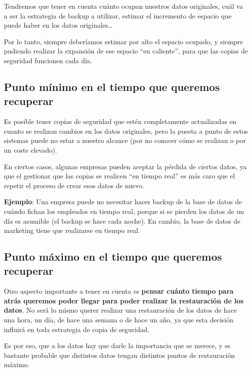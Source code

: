 Tendremos que tener en cuenta cuánto ocupan nuestros datos originales, cuál va a ser la estrategia de backup a utilizar, estimar el incremento de espacio que puede haber en los datos originales…

Por lo tanto, siempre deberíamos estimar por alto el espacio ocupado, y siempre pudiendo realizar la expansión de ese espacio “en caliente”, para que las copias de seguridad funcionen cada día.



\subsection{Punto mínimo en el tiempo que queremos recuperar}
Es posible tener copias de seguridad que estén completamente actualizadas en cuanto se realizan cambios en los datos originales, pero la puesta a punto de estos sistemas puede no estar a nuestro alcance (por no conocer cómo se realizan o por un coste elevado).

En ciertos casos, algunas empresas pueden aceptar la pérdida de ciertos datos, ya que el gestionar que las copias se realicen “en tiempo real” es más caro que el repetir el proceso de crear esos datos de nuevo.

\textbf{Ejemplo}: Una empresa puede no necesitar hacer backup de la base de datos de cuándo fichan los empleados en tiempo real, porque si se pierden los datos de un día es asumible (el backup se hace cada noche). En cambio, la base de datos de marketing tiene que realizarse en tiempo real.


\subsection{Punto máximo en el tiempo que queremos recuperar}
Otro aspecto importante a tener en cuenta es \textbf{pensar cuánto tiempo para atrás queremos poder llegar para poder realizar la restauración de los datos}. No será lo mismo querer realizar una restauración de los datos de hace una hora, un día, de hace una semana o de hace un año, ya que esta decisión influirá en toda estrategia de copia de seguridad.

Es por eso, que a los datos hay que darle la importancia que se merece, y es bastante probable que distintos datos tengan distintos puntos de restauración máximo.

